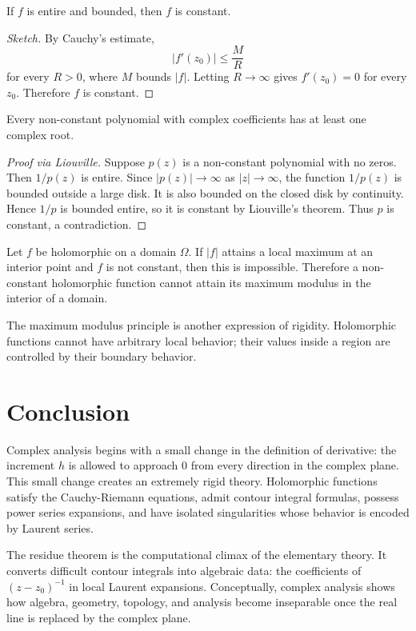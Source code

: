 \begin{theorem}
If $f$ is entire and bounded, then $f$ is constant.
\end{theorem}

\begin{proof}[Sketch]
By Cauchy's estimate,
\[
    |f'(z_0)|\leq \frac{M}{R}
\]
for every $R>0$, where $M$ bounds $|f|$. Letting $R\to\infty$ gives $f'(z_0)=0$ for every $z_0$. Therefore $f$ is constant.
\end{proof}

\begin{theorem}
Every non-constant polynomial with complex coefficients has at least one complex root.
\end{theorem}

\begin{proof}[Proof via Liouville]
Suppose $p(z)$ is a non-constant polynomial with no zeros. Then $1/p(z)$ is entire. Since $|p(z)|\to\infty$ as $|z|\to\infty$, the function $1/p(z)$ is bounded outside a large disk. It is also bounded on the closed disk by continuity. Hence $1/p$ is bounded entire, so it is constant by Liouville's theorem. Thus $p$ is constant, a contradiction.
\end{proof}

\newpage

\begin{theorem}
Let $f$ be holomorphic on a domain $\Omega$. If $|f|$ attains a local maximum at an interior point and $f$ is not constant, then this is impossible. Therefore a non-constant holomorphic function cannot attain its maximum modulus in the interior of a domain.
\end{theorem}

\begin{remark}
The maximum modulus principle is another expression of rigidity. Holomorphic functions cannot have arbitrary local behavior; their values inside a region are controlled by their boundary behavior.
\end{remark}

\section{Conclusion}

Complex analysis begins with a small change in the definition of derivative: the increment $h$ is allowed to approach $0$ from every direction in the complex plane. This small change creates an extremely rigid theory. Holomorphic functions satisfy the Cauchy-Riemann equations, admit contour integral formulas, possess power series expansions, and have isolated singularities whose behavior is encoded by Laurent series.

The residue theorem is the computational climax of the elementary theory. It converts difficult contour integrals into algebraic data: the coefficients of $(z-z_0)^{-1}$ in local Laurent expansions. Conceptually, complex analysis shows how algebra, geometry, topology, and analysis become inseparable once the real line is replaced by the complex plane.

